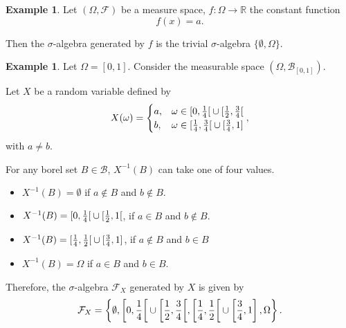 \documentclass[a4paper,12pt]{scrreprt}
\newcommand{\R}{\mathbb{R}}
\theoremstyle{definition}
\newtheorem{example}[definition]{Example}
\theoremstyle{plain}
\theoremstyle{remark}
\begin{document}
\begin{example}
  Let $(\Omega, \mathcal{F})$ be a measure space, $f\colon \Omega \to \R$ the constant function
  \begin{equation*}
    f(x) = a.
  \end{equation*}

  Then the $\sigma$-algebra generated by $f$ is the trivial $\sigma$-algebra $\{\emptyset, \Omega\}$.
\end{example}

\begin{example}
  \label{eg:sigmaalgebrageneratedbytwovaluedfunction}
  Let $\Omega = [0, 1]$. Consider the measurable space $(\Omega, \mathcal{B}_{[0, 1]})$.

  Let $X$ be a random variable defined by
  \begin{equation*}
    X(\omega) =
    \begin{cases}
      a, &\omega \in \interval[open right]{0}{\frac{1}{4}} \cup \interval[open right]{\frac{1}{2}}{\frac{3}{4}} \\
      b, &\omega \in \interval[open right]{\frac{1}{4}}{\frac{3}{4}} \cup \interval{\frac{3}{4}}{1}
    \end{cases},
  \end{equation*}
  with $a \neq b$.

  For any borel set $B \in \mathcal{B}$, $X^{-1}(B)$ can take one of four values.
  \begin{itemize}
    \item $X^{-1}(B) = \emptyset$ if $a \notin B$ and $b \notin B$.

    \item $X^{-1}(B) = \interval[open right]{0}{\frac{1}{4}} \cup \interval[open right]{\frac{1}{2}}{1}$, if $a \in B$ and $b \notin B$.

    \item $X^{-1}(B) = \interval[open right]{\frac{1}{4}}{\frac{1}{2}} \cup \interval{\frac{3}{4}}{1}$, if $a \notin B$ and $b \in B$

    \item $X^{-1}(B) = \Omega$ if $a \in B$ and $b \in B$.
  \end{itemize}

  Therefore, the $\sigma$-algebra $\mathcal{F}_{X}$ generated by $X$ is given by
  \begin{equation*}
    \mathcal{F}_{X} = \left\{ \emptyset, \interval[open right, scaled]{0}{\frac{1}{4}} \cup \interval[open right, scaled]{\frac{1}{2}}{\frac{3}{4}}, \interval[open right, scaled]{\frac{1}{4}}{\frac{1}{2}} \cup \left[\frac{3}{4}, 1\right], \Omega \right\}.
  \end{equation*}
\end{example}
\end{document}
